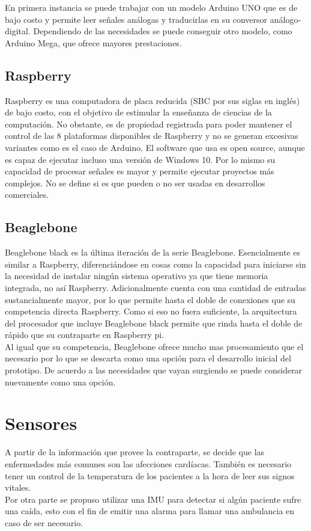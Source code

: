 En primera instancia se puede trabajar con un modelo Arduino UNO que es de bajo costo y permite leer señales análogas y traducirlas en su conversor análogo-digital. Dependiendo de las necesidades se puede conseguir otro modelo, como Arduino Mega, que ofrece mayores prestaciones. 
\subsection{Raspberry}
Raspberry es una computadora de placa reducida (SBC por sus siglas en inglés) de bajo costo, con el objetivo de estimular la enseñanza de ciencias de la computación. No obstante, es de propiedad registrada para poder mantener el control de las 8 plataformas disponibles de Raspberry y no se generan excesivas variantes como es el caso de Arduino. El software que usa es open source, aunque es capaz de ejecutar incluso una versión de Windows 10. Por lo mismo su capacidad de procesar señales es mayor y permite ejecutar proyectos más complejos. No se define si es que pueden o no ser usadas en desarrollos comerciales.

\newpage
\subsection{Beaglebone}
Beaglebone black es la última iteración de la serie Beaglebone. Esencialmente es similar a Raspberry, diferenciándose en cosas como la capacidad para iniciarse sin la necesidad de instalar ningún sistema operativo ya que tiene memoria integrada, no así Raspberry. Adicionalmente cuenta con una cantidad de entradas sustancialmente mayor, por lo que permite hasta el doble de conexiones que su competencia directa Raspberry. Como si eso no fuera suficiente, la arquitectura del procesador que incluye Beaglebone black permite que rinda hasta el doble de rápido que su contraparte en Raspberry pi. \\
Al igual que su competencia, Beaglebone ofrece mucho mas procesamiento que el necesario por lo que se descarta como una opción para el desarrollo inicial del prototipo. De acuerdo a las necesidades que vayan surgiendo se puede considerar nuevamente como una opción.
\newpage
\section{Sensores}
A partir de la información que provee la contraparte, se decide que las enfermedades  más comunes son las afecciones cardíacas. También es necesario tener un control de la temperatura de los pacientes a la hora de leer sus signos vitales. \\
Por otra parte se propuso utilizar una IMU para detectar si algún paciente sufre una caída, esto con el fin de emitir una alarma para llamar una ambulancia en caso de ser necesario.
